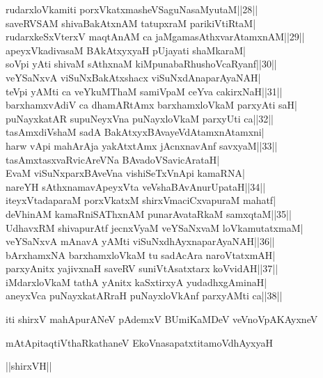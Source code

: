 \documentclass{article}
\begin{document}
rudarxloVkamiti porxVkatxmasheVSaguNasaMyutaM||28||\\
saveRVSAM shivaBakAtxnAM tatupxraM parikiVtiRtaM|\\
rudarxkeSxVterxV maqtAnAM ca jaMgamasAthxvarAtamxnAM||29||\\
apeyxVkadivasaM BAkAtxyxyaH pUjayati shaMkaraM|\\
soVpi yAti shivaM sAthxnaM kiMpunabaRhushoVcaRyanf||30||\\
veYSaNxvA viSuNxBakAtxshacx viSuNxdAnaparAyaNAH|\\
teVpi yAMti ca veYkuMThaM samiVpaM ceYva cakirxNaH||31||\\
barxhamxvAdiV ca dhamARtAmx barxhamxloVkaM parxyAti saH|\\
puNayxkatAR supuNeyxVna puNayxloVkaM parxyUti ca||32||\\
tasAmxdiVshaM sadA BakAtxyxBAvayeVdAtamxnAtamxni|\\
harw vApi mahArAja yakAtxtAmx jAcnxnavAnf savxyaM||33||\\
tasAmxtasxvaRvicAreVNa BAvadoVSavicArataH|\\
EvaM viSuNxparxBAveVna vishiSeTxVnApi kamaRNA|\\
nareYH sAthxnamavApeyxVta veVshaBAvAnurUpataH||34||\\
iteyxVtadaparaM porxVkatxM shirxVmaciCxvapuraM mahatf|\\
deVhinAM kamaRniSAThxnAM punarAvataRkaM samxqtaM||35||\\
UdhavxRM shivapurAtf jecnxVyaM veYSaNxvaM loVkamutatxmaM|\\
veYSaNxvA mAnavA yAMti viSuNxdhAyxnaparAyaNAH||36||\\
bArxhamxNA barxhamxloVkaM  tu sadAcAra naroVtatxmAH|\\
parxyAnitx yajivxnaH saveRV suniVtAsatxtarx koVvidAH||37||\\
iMdarxloVkaM tathA yAnitx kaSxtirxyA yudadhxgAminaH|\\
aneyxVca puNayxkatARraH puNayxloVkAnf parxyAMti ca||38||

\begin{center}
iti shirxV mahApurANeV pAdemxV BUmiKaMDeV veVnoVpAKAyxneV
\end{center}

\begin{center}
mAtApitaqtiVthaRkathaneV EkoVnasapatxtitamoVdhAyxyaH
\end{center}

\begin{center}
||shirxVH||
\end{center}
\end{document}
